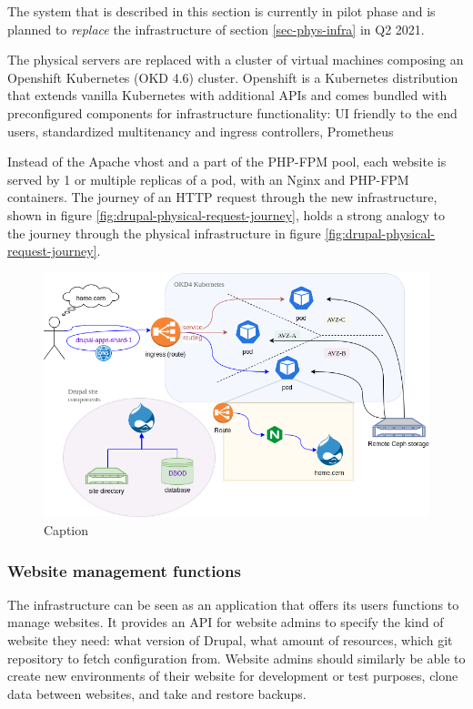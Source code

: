 The system that is described in this section is currently in pilot phase and is planned to \emph{replace} the infrastructure of section \ref{sec-phys-infra} in Q2 2021.

The physical servers are replaced with a cluster of virtual machines composing an Openshift Kubernetes (OKD 4.6) cluster.
Openshift is a Kubernetes distribution that extends vanilla Kubernetes with additional APIs and comes bundled with preconfigured components for infrastructure functionality:
UI friendly to the end users, standardized multitenancy and ingress controllers, Prometheus

Instead of the Apache vhost and a part of the PHP-FPM pool, each website is served by 1 or multiple replicas of a pod,
with an Nginx and PHP-FPM containers.
The journey of an HTTP request through the new infrastructure, shown in figure \ref{fig:drupal-physical-request-journey},
holds a strong analogy to the journey through the physical infrastructure in figure \ref{fig:drupal-physical-request-journey}.

\begin{figure}[ht]
    \centering
    \includegraphics[width=\textwidth]{figures/drupal-k8s-request-journey}
    \caption{Caption}
    \label{fig:drupal-k8s-request-journey}
\end{figure}

\subsubsection*{Website management functions}

The infrastructure can be seen as an application that offers its users functions to manage websites.
It provides an API for website admins to specify the kind of website they need: what version of Drupal, what amount of resources, which git repository to fetch configuration from.
Website admins should similarly be able to create new environments of their website for development or test purposes,
clone data between websites, and take and restore backups.

